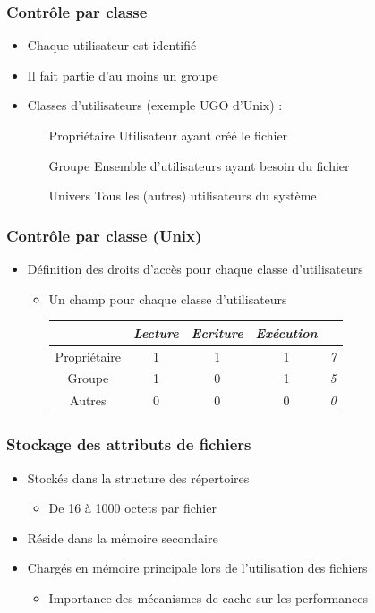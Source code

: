 \begin{frame}
\frametitle{Contrôle par classe}
\begin{itemize}
\item Chaque utilisateur est identifié
\item Il fait partie d'au moins un groupe
\item Classes d'utilisateurs (exemple UGO d'Unix) :
\begin{itemize}
\item [Propriétaire] Utilisateur ayant créé le fichier
\item [Groupe] Ensemble d'utilisateurs ayant besoin du fichier
\item [Univers] Tous les (autres) utilisateurs du système
\end{itemize}
\end{itemize}
\end{frame}

\begin{frame}
\frametitle{Contrôle par classe (Unix)}
\begin{itemize}
\item Définition des droits d'accès pour chaque classe d'utilisateurs
\begin{itemize}
\item Un champ pour chaque classe d'utilisateurs
\begin{tabular}{c|c|c|c|c}
& \textit{Lecture} & \textit{Ecriture} & \textit{Exécution} &  \\
\hline
Propriétaire & 1 & 1 & 1 & \textit{7} \\
Groupe & 1 & 0 & 1 & \textit{5} \\
Autres & 0 & 0 & 0 & \textit{0} \\
\end{tabular}
\end{itemize}
\end{itemize}
\end{frame}



\begin{frame}
\frametitle{Stockage des attributs de fichiers}
\begin{itemize}
\item Stockés dans la structure des répertoires
\begin{itemize}
\item De 16 à 1000 octets par fichier
\end{itemize}
\item Réside dans la mémoire secondaire
\item Chargés en mémoire principale lors de l'utilisation des fichiers
\begin{itemize}
\item Importance des mécanismes de cache sur les performances
\end{itemize}
\end{itemize}
\end{frame}


